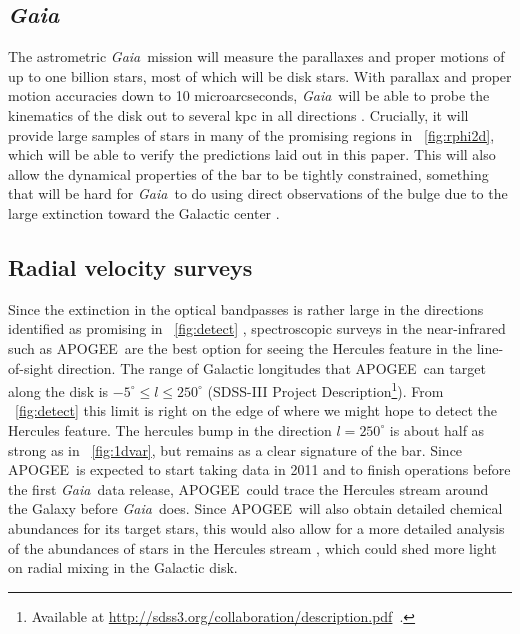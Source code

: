 \documentclass[12pt,preprint]{aastex}
\newcommand{\eg}{e.g.}
\newcommand{\Gaia}{\emph{Gaia}}
\newcommand{\apogee}{APOGEE}
\begin{document}
\subsection{\Gaia}

The astrometric \Gaia\ mission will measure the parallaxes and proper
motions of up to one billion stars, most of which will be disk
stars. With parallax and proper motion accuracies down to 10
microarcseconds, \Gaia\ will be able to probe the kinematics of the
disk out to several kpc in all directions
\citep{bailerjones08a}. Crucially, it will provide large samples of
stars in many of the promising regions in
\figurename~\ref{fig:rphi2d}, which will be able to verify the
predictions laid out in this paper. This will also allow the dynamical
properties of the bar to be tightly constrained, something that will
be hard for \Gaia\ to do using direct observations of the bulge due to
the large extinction toward the Galactic center \citep{robin05a}.



\subsection{Radial velocity surveys}

Since the extinction in the optical bandpasses is rather large in the
directions identified as promising in \figurename~\ref{fig:detect}
\citep[$A_V \approx 8$ mag toward $l \approx
270^{\circ}$;][]{marshall06a}, spectroscopic surveys in the
near-infrared such as \apogee\ are the best option for seeing the
Hercules feature in the line-of-sight direction. The range of Galactic
longitudes that \apogee\ can target along the disk is $-5^{\circ} \leq
l \leq 250^{\circ}$ (SDSS-III Project Description\footnote{Available
at \url{http://sdss3.org/collaboration/description.pdf}~.}). From
\figurename~\ref{fig:detect} this limit is right on the edge of where
we might hope to detect the Hercules feature. The hercules bump in the
direction $l = 250^{\circ}$ is about half as strong as in
\figurename~\ref{fig:1dvar}, but remains as a clear signature of the
bar. Since \apogee\ is expected to start taking data in 2011 and to
finish operations before the first \Gaia\ data release, \apogee\ could
trace the Hercules stream around the Galaxy before \Gaia\ does. Since
\apogee\ will also obtain detailed chemical abundances for its target
stars, this would also allow for a more detailed analysis of the
abundances of stars in the Hercules stream \citep[following,
\eg,][]{Bensby07a,Bovy10a}, which could shed more light on radial
mixing in the Galactic disk.
\end{document}
